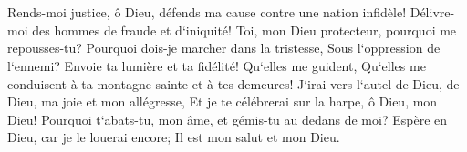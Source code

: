 \chapter{}

\verse Rends-moi justice, ô Dieu, défends ma cause contre une nation infidèle! Délivre-moi des hommes de fraude et d`iniquité! 
\verse Toi, mon Dieu protecteur, pourquoi me repousses-tu? Pourquoi dois-je marcher dans la tristesse, Sous l`oppression de l`ennemi? 
\verse Envoie ta lumière et ta fidélité! Qu`elles me guident, Qu`elles me conduisent à ta montagne sainte et à tes demeures! 
\verse J`irai vers l`autel de Dieu, de Dieu, ma joie et mon allégresse, Et je te célébrerai sur la harpe, ô Dieu, mon Dieu! 
\verse Pourquoi t`abats-tu, mon âme, et gémis-tu au dedans de moi? Espère en Dieu, car je le louerai encore; Il est mon salut et mon Dieu. 

\chapter{}

